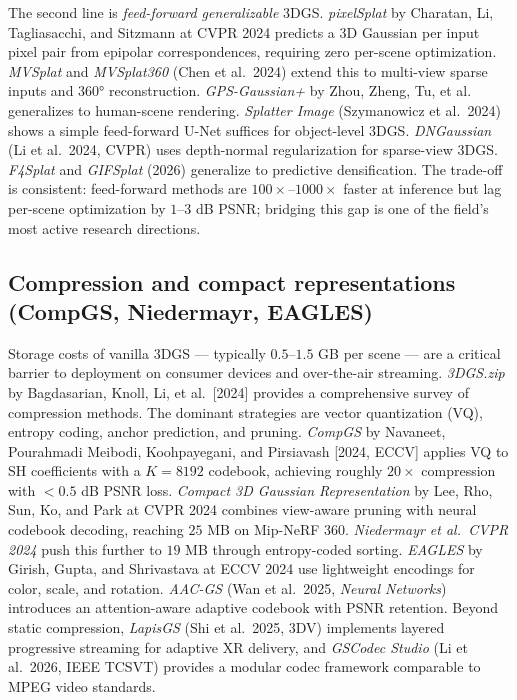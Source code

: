 \documentclass{article}
\begin{document}
The second line is \emph{feed-forward generalizable} 3DGS. \emph{pixelSplat} by Charatan, Li, Tagliasacchi, and Sitzmann at CVPR 2024 \cite{charatan2024pixelsplat3dgaussi} predicts a 3D Gaussian per input pixel pair from epipolar correspondences, requiring zero per-scene optimization. \emph{MVSplat} and \emph{MVSplat360} (Chen et al.~2024) extend this to multi-view sparse inputs and 360° reconstruction. \emph{GPS-Gaussian+} by Zhou, Zheng, Tu, et al.~\cite{zhou2024drivinggaussiancom} generalizes to human-scene rendering. \emph{Splatter Image} (Szymanowicz et al.~2024) shows a simple feed-forward U-Net suffices for object-level 3DGS. \emph{DNGaussian} (Li et al.~2024, CVPR) uses depth-normal regularization for sparse-view 3DGS. \emph{F4Splat} and \emph{GIFSplat} (2026) generalize to predictive densification. The trade-off is consistent: feed-forward methods are \(100\times\)--\(1000\times\) faster at inference but lag per-scene optimization by \(1\)--\(3\) dB PSNR; bridging this gap is one of the field's most active research directions.

\subsection{Compression and compact representations (CompGS, Niedermayr, EAGLES)}\label{compression-and-compact-representations-compgs-niedermayr-eagles}

Storage costs of vanilla 3DGS --- typically \(0.5\)--\(1.5\) GB per scene --- are a critical barrier to deployment on consumer devices and over-the-air streaming. \emph{3DGS.zip} by Bagdasarian, Knoll, Li, et al.~{[}2024{]} provides a comprehensive survey of compression methods. The dominant strategies are vector quantization (VQ), entropy coding, anchor prediction, and pruning. \emph{CompGS} by Navaneet, Pourahmadi Meibodi, Koohpayegani, and Pirsiavash {[}2024, ECCV{]} applies VQ to SH coefficients with a \(K=8192\) codebook, achieving roughly \(20\times\) compression with \(<0.5\) dB PSNR loss. \emph{Compact 3D Gaussian Representation} by Lee, Rho, Sun, Ko, and Park at CVPR 2024 \cite{lee2024compact3dgaussianr} combines view-aware pruning with neural codebook decoding, reaching \(25\) MB on Mip-NeRF 360. \emph{Niedermayr et al.~CVPR 2024} push this further to \(19\) MB through entropy-coded sorting. \emph{EAGLES} by Girish, Gupta, and Shrivastava at ECCV 2024 \cite{girish2024eaglesefficientacc} use lightweight encodings for color, scale, and rotation. \emph{AAC-GS} (Wan et al.~2025, \emph{Neural Networks}) introduces an attention-aware adaptive codebook with PSNR retention. Beyond static compression, \emph{LapisGS} (Shi et al.~2025, 3DV) implements layered progressive streaming for adaptive XR delivery, and \emph{GSCodec Studio} (Li et al.~2026, IEEE TCSVT) provides a modular codec framework comparable to MPEG video standards.
\end{document}
